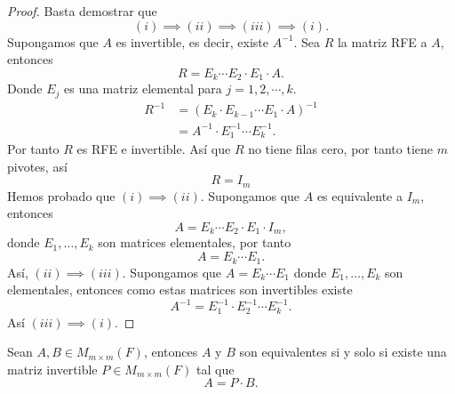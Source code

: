 \documentclass[12pt,a4paper]{book}
\begin{document}
    \begin{proof}
        Basta demostrar que
        \begin{equation*}
            (i)\implies (ii)\implies (iii)\implies (i).
        \end{equation*}
        Supongamos que $A$ es invertible, es decir, existe $A^{-1}$. Sea $R$ la matriz RFE
        a $A$, entonces
        \begin{equation*}
            R=E_{k}\cdots E_{2}\cdot E_{1}\cdot A.
        \end{equation*}
        Donde $E_{j}$ es una matriz elemental para $j=1,2,\cdots,k$.
        \begin{align*}
            R^{-1}&=(E_{k}\cdot E_{k-1}\cdots E_{1}\cdot A)^{-1}\\
            &=A^{-1}\cdot E_{1}^{-1}\cdots E_{k}^{-1}.
        \end{align*}
        Por tanto $R$ es RFE e invertible. Así que $R$ no tiene filas cero, por tanto tiene
        $m$ pivotes, así
        \begin{equation*}
            R=I_{m}
        \end{equation*}
        Hemos probado que $(i)\implies (ii)$. Supongamos que $A$ es equivalente a $I_{m}$, entonces
        \begin{equation*}
            A=E_{k}\cdots E_{2}\cdot E_{1}\cdot I_{m},
        \end{equation*}
        donde $E_{1},\dots,E_{k}$ son matrices elementales, por tanto
        \begin{equation*}
            A=E_{k}\cdots E_{1}.
        \end{equation*}
        Así, $(ii)\implies (iii)$. Supongamos que $A=E_{k}\cdots E_{1}$ donde $E_{1},\dots,E_{k}$
        son elementales, entonces como estas matrices son invertibles existe
        \begin{equation*}
            A^{-1}=E_{1}^{-1}\cdot E_{2}^{-1}\cdots E_{k}^{-1}.
        \end{equation*}
        Así $(iii)\implies (i)$.
    \end{proof}

    \begin{corolario}
    \label{coro:3}
        Sean $A,B\in M_{m\times m}(F)$, entonces $A$ y $B$ son equivalentes si y solo si
        existe una matriz invertible $P\in M_{m\times m}(F)$ tal que
        \begin{equation*}
            A=P\cdot B.
        \end{equation*}
    \end{corolario}
\end{document}
